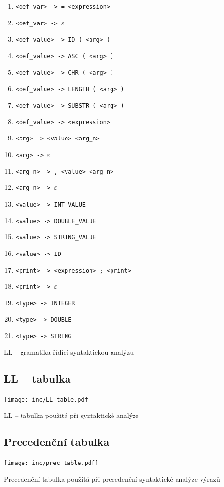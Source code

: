 \documentclass[a4paper, 11pt]{article}
\begin{document}
\begin{table}[!ht]
\begin{enumerate}[noitemsep]
			\item \verb|<def_var> -> = <expression>|
			\item \verb|<def_var> -> |$\varepsilon$

			\item \verb|<def_value> -> ID ( <arg> )|
			\item \verb|<def_value> -> ASC ( <arg> )|
			\item \verb|<def_value> -> CHR ( <arg> )|
			\item \verb|<def_value> -> LENGTH ( <arg> )|
			\item \verb|<def_value> -> SUBSTR ( <arg> )|
			\item \verb|<def_value> -> <expression>|

			\item \verb|<arg> -> <value> <arg_n>|
			\item \verb|<arg> -> |$\varepsilon$

			\item \verb|<arg_n> -> , <value> <arg_n>|
			\item \verb|<arg_n> -> |$\varepsilon$

			\item \verb|<value> -> INT_VALUE|
			\item \verb|<value> -> DOUBLE_VALUE|
			\item \verb|<value> -> STRING_VALUE|
			\item \verb|<value> -> ID|

			\item \verb|<print> -> <expression> ; <print>|
			\item \verb|<print> -> |$\varepsilon$

			\item \verb|<type> -> INTEGER|
			\item \verb|<type> -> DOUBLE|
			\item \verb|<type> -> STRING|
		\end{enumerate}

		\caption{LL -- gramatika řídící syntaktickou analýzu}
		\label{table:ll_gramatika}
	\end{table}


	\subsection{LL -- tabulka}
	\begin{table}[!ht]
		\centering
		\texttt{[image: inc/LL\_table.pdf]}
		\caption{LL -- tabulka použitá při syntaktické analýze}
		\label{table:ll_table}
	\end{table}


	\subsection{Precedenční tabulka}
	\begin{table}[!ht]
		\centering
		\texttt{[image: inc/prec\_table.pdf]}
		\caption{Precedenční tabulka použitá při precedenční syntaktické analýze výrazů}
		\label{table:prec_table}
	\end{table}
\end{document}
